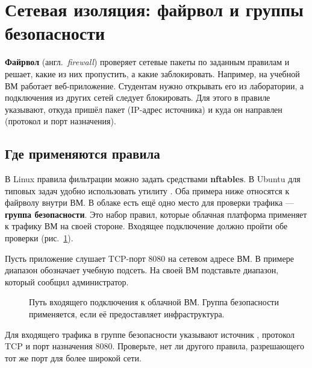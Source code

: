 \section{Сетевая изоляция: файрвол и группы безопасности}

\textbf{Файрвол} (англ.\ \emph{firewall}) проверяет
сетевые пакеты по заданным правилам и решает, какие из них пропустить,
а какие заблокировать. Например, на учебной ВМ работает веб-приложение.
Студентам нужно открывать его из лаборатории, а подключения из других
сетей следует блокировать. Для этого в правиле указывают, откуда пришёл пакет
(IP-адрес источника) и куда он направлен (протокол и порт назначения).

\subsection{Где применяются правила}

В Linux правила фильтрации можно задать средствами \textbf{nftables}.
В Ubuntu для типовых задач удобно использовать утилиту .
Оба примера ниже относятся к файрволу внутри ВМ. В облаке есть ещё одно
место для проверки трафика --- \textbf{группа безопасности}. Это набор
правил, которые облачная платформа применяет к трафику ВМ на своей
стороне. Входящее подключение должно пройти обе проверки
(рис.~\ref{fig:security-firewall}).

Пусть приложение слушает TCP-порт 8080 на сетевом адресе ВМ.
В примере диапазон  обозначает учебную подсеть.
На своей ВМ подставьте диапазон, который сообщил администратор.

\begin{figure}[htb]
  \centering
  \caption{Путь входящего подключения к облачной ВМ. Группа безопасности
    применяется, если её предоставляет инфраструктура.}
  \label{fig:security-firewall}
\end{figure}

Для входящего трафика в группе безопасности указывают источник
, протокол TCP и порт назначения 8080. Проверьте,
нет ли другого правила, разрешающего тот же порт для более широкой
сети.


